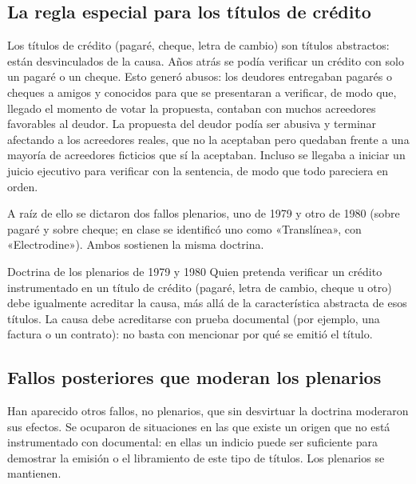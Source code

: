 \documentclass[12pt,oneside]{book}
\begin{document}
\subsection{La regla especial para los títulos de crédito}

Los títulos de crédito (pagaré, cheque, letra de cambio) son títulos abstractos: están desvinculados de la causa. Años atrás se podía verificar un crédito con solo un pagaré o un cheque. Esto generó abusos: los deudores entregaban pagarés o cheques a amigos y conocidos para que se presentaran a verificar, de modo que, llegado el momento de votar la propuesta, contaban con muchos acreedores favorables al deudor. La propuesta del deudor podía ser abusiva y terminar afectando a los acreedores reales, que no la aceptaban pero quedaban frente a una mayoría de acreedores ficticios que sí la aceptaban. Incluso se llegaba a iniciar un juicio ejecutivo para verificar con la sentencia, de modo que todo pareciera en orden.

A raíz de ello se dictaron dos fallos plenarios, uno de 1979 y otro de 1980 (sobre pagaré y sobre cheque; en clase se identificó uno como «Translínea», con «Electrodine»). Ambos sostienen la misma doctrina.

\begin{definition}{Doctrina de los plenarios de 1979 y 1980}
Quien pretenda verificar un crédito instrumentado en un título de crédito (pagaré, letra de cambio, cheque u otro) debe igualmente acreditar la causa, más allá de la característica abstracta de esos títulos. La causa debe acreditarse con prueba documental (por ejemplo, una factura o un contrato): no basta con mencionar por qué se emitió el título.
\end{definition}

\subsection{Fallos posteriores que moderan los plenarios}

Han aparecido otros fallos, no plenarios, que sin desvirtuar la doctrina moderaron sus efectos. Se ocuparon de situaciones en las que existe un origen que no está instrumentado con documental: en ellas un indicio puede ser suficiente para demostrar la emisión o el libramiento de este tipo de títulos. Los plenarios se mantienen.
\end{document}
